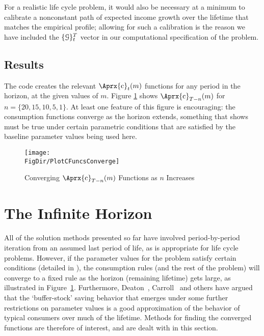 \documentclass[titlepage, headings=optiontotocandhead]{Resources/texmf-local/tex/latex/econtex}
\newcommand{\MoM}{\ifthenelse{\boolean{MoMVersion}}}
\begin{document}
For a realistic life cycle problem, it would also be necessary at a
minimum to calibrate a nonconstant path of expected income growth over the
lifetime that matches the empirical profile; allowing for such
a calibration is the reason we have included the $\{\mathcal{G}\}_{t}^{T}$
vector in our computational specification of the problem.

\hypertarget{results}{}
\subsection{Results}

The code creates the relevant $\Aprx{\cFunc}_{t}(m)$ functions for any period in the horizon, at the given values of $m$.  Figure \ref{fig:PlotCFuncsConverge} shows $\Aprx{\cFunc}_{T-n}(m)$ for $n=\{20,15,10,5,1\}$.  At least one feature of this figure is encouraging: the consumption functions converge as the horizon extends, something that \cite{BufferStockTheory} shows must be true under certain parametric conditions that are satisfied by the baseline parameter values being used here.

\hypertarget{PlotCFuncsConverge}{}
\begin{figure}
  \texttt{[image: \\FigDir/PlotCFuncsConverge]}
  \caption{Converging $\Aprx{\cFunc}_{T-n}(m)$ Functions as $n$ Increases}
  \label{fig:PlotCFuncsConverge}
\end{figure}



\hypertarget{the-infinite-horizon}{}
\section{The Infinite Horizon}\label{sec:the-infinite-horizon}

All of the solution methods presented so far have involved period-by-period iteration from an assumed last period of life, as is appropriate for life cycle problems.  However, if the parameter values for the problem satisfy certain conditions (detailed in \cite{BufferStockTheory}), the consumption rules (and the rest of the problem) will converge to a fixed rule as the horizon (remaining lifetime) gets large, as illustrated in Figure~\ref{fig:PlotCFuncsConverge}.  Furthermore, Deaton~\citeyearpar{deatonLiqConstr}, Carroll~\citeyearpar{carroll:brookings,carrollBSLCPIH} and others have argued that the `buffer-stock' saving behavior that emerges under some further restrictions on parameter values is a good approximation of the behavior of typical consumers over much of the lifetime.  Methods for finding the converged functions are therefore of interest, and are dealt with in this section.
\end{document}
